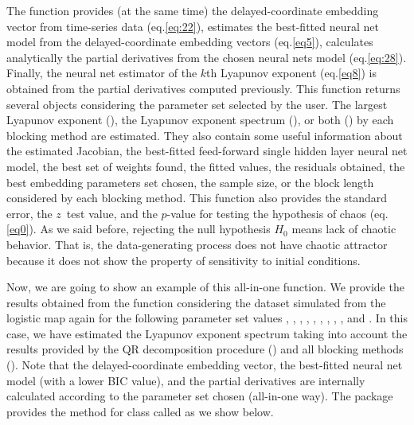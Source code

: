The  function provides (at the same time) the delayed-coordinate embedding vector from time-series data (eq.\ref{eq:22}), estimates the best-fitted neural net model from the delayed-coordinate embedding vectors (eq.\ref{eq5}), calculates analytically the partial derivatives from the chosen neural nets model (eq.\ref{eq:28}). Finally, the neural net estimator of the $k$th Lyapunov exponent (eq.\ref{eq8}) is obtained from the partial derivatives computed previously. This function returns several objects considering the parameter set selected by the user. The largest Lyapunov exponent (), the Lyapunov exponent spectrum (), or both () by each blocking method are estimated. They also contain some useful information about the estimated Jacobian, the best-fitted feed-forward single hidden layer neural net model, the best set of weights found, the fitted values, the residuals obtained, the best embedding parameters set chosen, the sample size, or the block length considered by each blocking method. This function also provides the standard error, the $z$~test value, and the $p$-value for testing the hypothesis of chaos (eq.\ref{eq0}). As we said before, rejecting the null hypothesis $H_0$ means lack of chaotic behavior. That is, the data-generating process does not have chaotic attractor because it does not show the property of sensitivity to initial conditions. 

Now, we are going to show an example of this all-in-one function. We provide the results obtained from the  function considering the dataset simulated from the logistic map again for the following parameter set values , , , , , , , , , and . In this case, we have estimated the Lyapunov exponent spectrum taking into account the results provided by the QR decomposition procedure () and all blocking methods (). Note that the delayed-coordinate embedding vector, the best-fitted neural net model (with a lower BIC value), and the partial derivatives are internally calculated according to the parameter set chosen (all-in-one way). The  package provides the  method for class  called  as we show below. 


